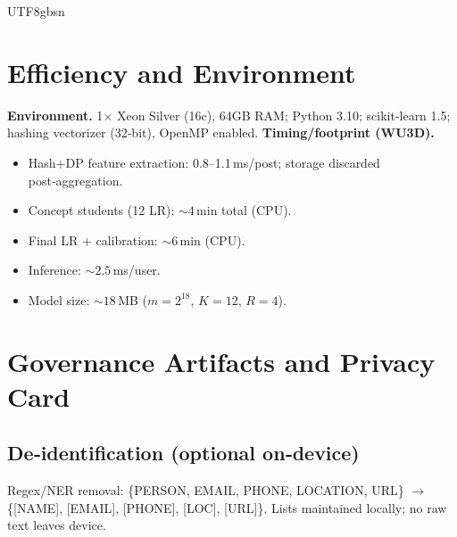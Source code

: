 \documentclass[acmsmall,natbib]{acmart}
\begin{document}
\begin{CJK*}{UTF8}{gbsn}
\section{Efficiency and Environment}
\label{app:env}
\textbf{Environment.} 1$\times$ Xeon Silver (16c), 64GB RAM; Python 3.10; scikit‑learn 1.5; hashing vectorizer (32‑bit), OpenMP enabled.  
\textbf{Timing/footprint (WU3D).}
\begin{itemize}[leftmargin=1.2em,itemsep=1pt]
\item Hash+DP feature extraction: 0.8--1.1\,ms/post; storage discarded post‑aggregation.
\item Concept students (12 LR): ${\sim}4$\,min total (CPU).
\item Final LR + calibration: ${\sim}6$\,min (CPU).
\item Inference: ${\sim}2.5$\,ms/user.
\item Model size: ${\sim}18$\,MB ($m{=}2^{18}$, $K{=}12$, $R{=}4$).
\end{itemize}


\section{Governance Artifacts and Privacy Card}
\label{app:governance}

\subsection{De‑identification (optional on‑device)}
Regex/NER removal: \{PERSON, EMAIL, PHONE, LOCATION, URL\} $\rightarrow$ \{[NAME], [EMAIL], [PHONE], [LOC], [URL]\}. Lists maintained locally; no raw text leaves device.


\end{CJK*}
\end{document}

